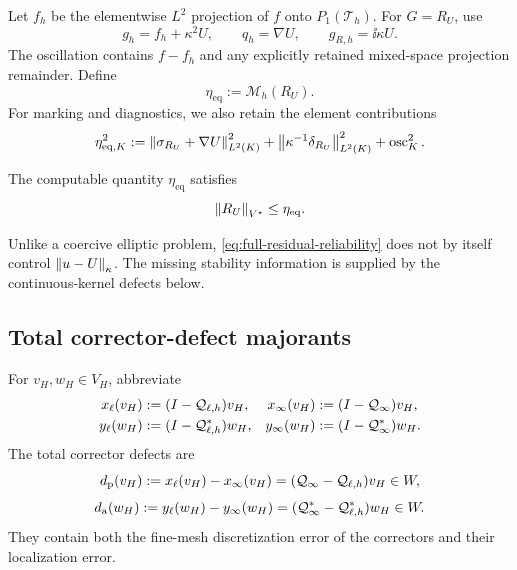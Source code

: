 Let $f_h$ be the elementwise $L^2$ projection of $f$ onto
$P_1(\mathcal T_h)$.  For $G=R_U$, use
\begin{equation}
\label{eq:full-residual-data}
  g_h=f_h+\kappa^2U,
  \qquad q_h=\nabla U,
  \qquad g_{R,h}=\ii\kappa U.
\end{equation}
The oscillation contains $f-f_h$ and any explicitly retained mixed-space
projection remainder.  Define
\begin{equation}
\label{eq:eta-eq}
  \eta_{\mathrm{eq}}:=\mathscr M_h(R_U).
\end{equation}
For marking and diagnostics, we also retain the element contributions
\begin{equation}
\label{eq:eta-eq-element}
  \eta_{\mathrm{eq},K}^2
  :=\left\lVert \sigma_{R_U}+\nabla U\right\rVert_{L^2(K)}^2
    +\left\lVert \kappa^{-1}\delta_{R_U}\right\rVert_{L^2(K)}^2
    +\operatorname{osc}_K^2.
\end{equation}

\begin{corollary}
\label{cor:full-residual-reliability}
The computable quantity $\eta_{\mathrm{eq}}$ satisfies
\begin{equation}
\label{eq:full-residual-reliability}
  \left\lVert R_U\right\rVert_{V^\star}\leq\eta_{\mathrm{eq}}.
\end{equation}
\end{corollary}

Unlike a coercive elliptic problem, \eqref{eq:full-residual-reliability}
does not by itself control $\left\lVert u-U\right\rVert_\kappa$.  The missing stability
information is supplied by the continuous-kernel defects below.

\subsection{Total corrector-defect majorants}
\label{sec:total-defects}

For $v_H,w_H\in V_H$, abbreviate
\begin{align}
  x_\ell(v_H)&:=(I-\mathcal Q_{\ell,h})v_H,
  &x_\infty(v_H)&:=(I-\mathcal Q_\infty)v_H,
  \label{eq:trial-parametrizations}\\
  y_\ell(w_H)&:=(I-\mathcal Q_{\ell,h}^*)w_H,
  &y_\infty(w_H)&:=(I-\mathcal Q_\infty^*)w_H.
  \label{eq:test-parametrizations}
\end{align}
The total corrector defects are
\begin{equation}
\label{eq:total-defect-functions}
  d_{\mathrm p}(v_H):=x_\ell(v_H)-x_\infty(v_H)
  =(\mathcal Q_\infty-\mathcal Q_{\ell,h})v_H\in W,
\end{equation}
\begin{equation}
\label{eq:total-defect-functions-adjoint}
  d_{\mathrm a}(w_H):=y_\ell(w_H)-y_\infty(w_H)
  =(\mathcal Q_\infty^*-\mathcal Q_{\ell,h}^*)w_H\in W.
\end{equation}
They contain both the fine-mesh discretization error of the correctors and
their localization error.

